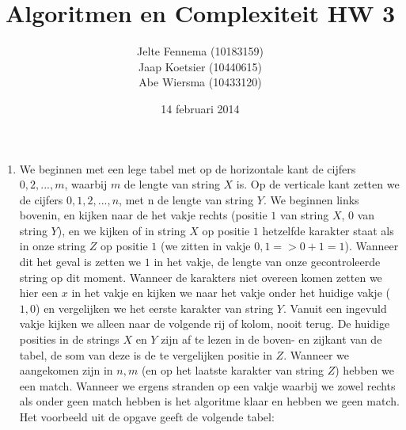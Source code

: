 \documentclass[11pt]{article}
\title{\textbf{Algoritmen en Complexiteit HW 3}}
\author{Jelte Fennema (10183159)\\
		Jaap Koetsier (10440615)\\
        Abe Wiersma (10433120)}
\date{14 februari 2014}
\begin{document}
\maketitle

\begin{enumerate}
    \item We beginnen met een lege tabel met op de horizontale kant de cijfers $0, 2, ..., m$,
    	waarbij $m$ de lengte van string $X$ is. Op de verticale kant zetten we de cijfers
    	$0, 1, 2, ..., n$, met n de lengte van string $Y$. We beginnen links bovenin, en kijken
    	naar de het vakje rechts (positie $1$ van string $X$, $0$ van string $Y$), en we kijken
    	of in string $X$ op positie $1$ hetzelfde karakter staat als in onze string $Z$ op
    	positie $1$ (we zitten in vakje $0, 1 => 0 + 1 = 1$). Wanneer dit het geval is zetten we
    	$1$ in het vakje, de lengte van onze gecontroleerde string op dit moment. Wanneer de
    	karakters niet overeen komen zetten we hier een $x$ in het vakje en kijken
    	we naar het vakje onder het huidige vakje ($1,0$) en vergelijken we het eerste karakter
    	van string $Y$. Vanuit een ingevuld vakje kijken we alleen naar de volgende rij of kolom,
    	nooit terug. De huidige posities in de strings $X$ en $Y$ zijn af te lezen in de boven-
    	en zijkant van de tabel, de som van deze is de te vergelijken positie in $Z$. Wanneer
    	we aangekomen zijn in $n, m$ (en op het laatste karakter van string $Z$) hebben we
    	een match. Wanneer we ergens stranden op een vakje waarbij we zowel rechts als onder
    	geen match hebben is het algoritme klaar en hebben we geen match.\\
    	Het voorbeeld uit de opgave geeft de volgende tabel:


\end{enumerate}
\end{document}
